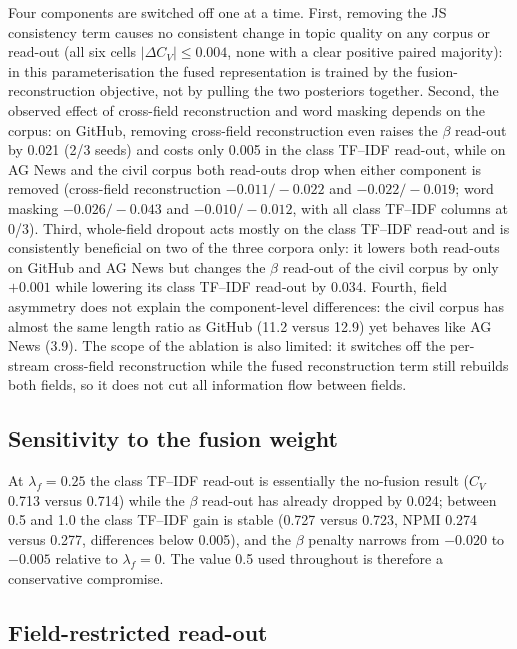 \documentclass[11pt]{article}
\begin{document}
Four components are switched off one at a time. First, removing the JS consistency term causes no
consistent change in topic quality on any corpus or read-out (all six cells
$|\Delta C_V|\leq0.004$, none with a clear positive paired majority): in this
parameterisation the fused representation is trained by the fusion-reconstruction objective, not by
pulling the two posteriors together. Second, the observed effect of cross-field reconstruction
and word masking depends on the corpus: on GitHub, removing cross-field reconstruction even raises
the $\beta$ read-out by 0.021 (2/3 seeds) and costs only 0.005 in the class TF--IDF read-out, while
on AG News and the civil corpus both read-outs drop when either component is removed (cross-field
reconstruction $-0.011/-0.022$ and $-0.022/-0.019$; word masking $-0.026/-0.043$ and
$-0.010/-0.012$, with all class TF--IDF columns at 0/3). Third, whole-field dropout acts mostly on
the class TF--IDF read-out and is consistently beneficial on two of the three corpora only: it
lowers both read-outs on GitHub
and AG News but changes the $\beta$ read-out of the civil corpus by only $+0.001$ while lowering
its class TF--IDF read-out by 0.034. Fourth, field asymmetry does not explain the component-level
differences: the civil corpus has almost the same length ratio as GitHub (11.2 versus 12.9) yet
behaves like AG News (3.9). The scope of the ablation is also limited: it switches off the
per-stream cross-field reconstruction while the fused reconstruction term still rebuilds both
fields, so it does not cut all information flow between fields.

\subsection{Sensitivity to the fusion weight}



At $\lambda_f=0.25$ the class TF--IDF read-out is essentially the no-fusion result ($C_V$ 0.713
versus 0.714) while the $\beta$ read-out has already dropped by 0.024; between 0.5 and 1.0 the
class TF--IDF gain is stable (0.727 versus 0.723, NPMI 0.274 versus 0.277, differences below
0.005), and the $\beta$ penalty narrows from $-0.020$ to $-0.005$ relative to $\lambda_f=0$.
The value 0.5 used throughout is therefore a conservative compromise.

\subsection{Field-restricted read-out}
\end{document}
